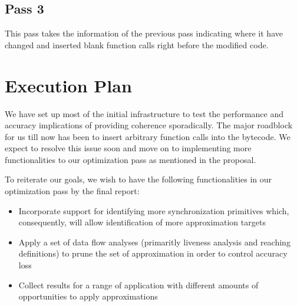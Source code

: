 \documentclass[12pt,conference]{IEEEtran}
\begin{document}
\subsection{Pass 3}

This pass takes the information of the previous pass indicating where it have changed and inserted blank function calls right before the modified code.

\section{Execution Plan}

We have set up most of the initial infrastructure to test the performance and 
accuracy implications of providing coherence sporadically. The major roadblock
for us till now has been to insert arbitrary function calls into the bytecode.
We expect to resolve this issue soon and move on to implementing more 
functionalities to our optimization pass as mentioned in the proposal.

To reiterate our goals, we wish to have the following functionalities in
our optimization pass by the final report:
\begin{itemize}
\item Incorporate support for identifying more synchronization primitives
which, consequently, will allow identification of more approximation targets
\item Apply a set of data flow analyses (primaritly liveness analysis and 
reaching definitions) to prune the set of approximation in order to control
accuracy loss
\item Collect results for a range of application with different amounts of 
opportunities to apply approximations
\end{itemize}
\end{document}
